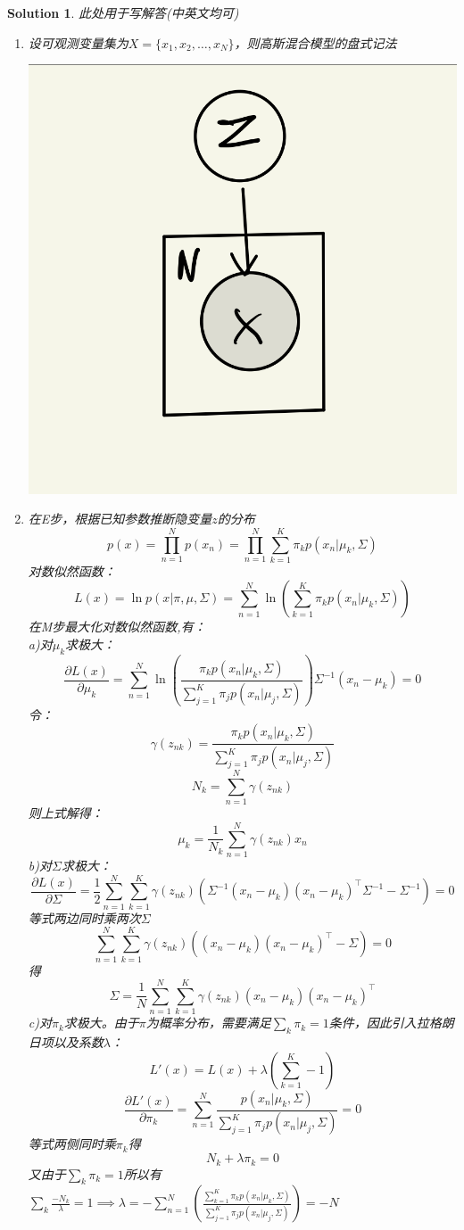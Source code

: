 \documentclass[a4paper,UTF8]{article}
\newtheorem*{solution}{Solution}
\numberwithin{equation}{section}
\begin{document}
\begin{solution}
此处用于写解答(中英文均可)
\begin{enumerate}

\item 设可观测变量集为$X=\{x_1,x_2,\dots,x_N\}$，则高斯混合模型的盘式记法

\centerline{\includegraphics[scale = 0.3]{4.1.png}}

\item 在E步，根据已知参数推断隐变量$z$的分布
$$p(x)=\prod_{n=1}^N p(x_n)=\prod_{n=1}^N\sum_{k=1}^K\pi_k p(x_n|\mu_k,\Sigma)$$
对数似然函数：
$$L(x)=\ln p(x|\pi,\mu,\Sigma)=\sum_{n=1}^N\ln\left(\sum_{k=1}^K\pi_k p(x_n|\mu_k,\Sigma)\right)$$
在M步最大化对数似然函数,有：\\
a)对$\mu_k$求极大：
$$\frac{\partial L(x)}{\partial \mu_k}=\sum_{n=1}^N\ln\left(\frac{\pi_k p(x_n|\mu_k,\Sigma)}{\sum_{j=1}^K\pi_j p(x_n|\mu_j,\Sigma)}\right)\Sigma^{-1}(x_n-\mu_k)=0$$
令：
$$\gamma(z_{nk})=\frac{\pi_k p(x_n|\mu_k,\Sigma)}{\sum_{j=1}^K\pi_j p(x_n|\mu_j,\Sigma)}$$
$$N_k=\sum_{n=1}^N\gamma(z_{nk})$$
则上式解得：
$$\mu_k=\frac 1 {N_k}\sum_{n=1}^N\gamma(z_{nk})x_n$$
b)对$\Sigma$求极大：
$$\frac{\partial L(x)}{\partial \Sigma}=\frac 1 2 \sum_{n=1}^N\sum_{k=1}^K\gamma(z_{nk})\left(\Sigma^{-1}(x_n-\mu_k)(x_n-\mu_k)^\top\Sigma^{-1}-\Sigma^{-1}\right)=0$$
等式两边同时乘两次$\Sigma$
$$\sum_{n=1}^N\sum_{k=1}^K\gamma(z_{nk})\left((x_n-\mu_k)(x_n-\mu_k)^\top-\Sigma\right)=0$$
得
$$\Sigma=\frac 1 N\sum_{n=1}^N\sum_{k=1}^K\gamma(z_{nk})(x_n-\mu_k)(x_n-\mu_k)^\top$$
c)对$\pi_k$求极大。由于$\pi$为概率分布，需要满足$\sum_k \pi_k=1$条件，因此引入拉格朗日项以及系数$\lambda$：
$$L'(x)=L(x)+\lambda(\sum_{k=1}^K-1)$$
$$\frac{\partial L'(x)}{\partial \pi_k}=\sum_{n=1}^N\frac{p(x_n|\mu_k,\Sigma)}{\sum_{j=1}^K\pi_jp(x_n|\mu_j,\Sigma)}=0$$
等式两侧同时乘$\pi_k$得
$$N_k+\lambda\pi_k=0$$
又由于$\sum_k \pi_k=1$所以有$\sum_k \frac {-N_k}{\lambda}=1 \implies \lambda = -\sum_{n=1}^N\left(  \frac{\sum_{k=1}^K\pi_k p(x_n|\mu_k,\Sigma)}{\sum_{j=1}^K\pi_j p(x_n|\mu_j,\Sigma)}\right)=-N$


\end{enumerate}
\end{solution}
\end{document}
